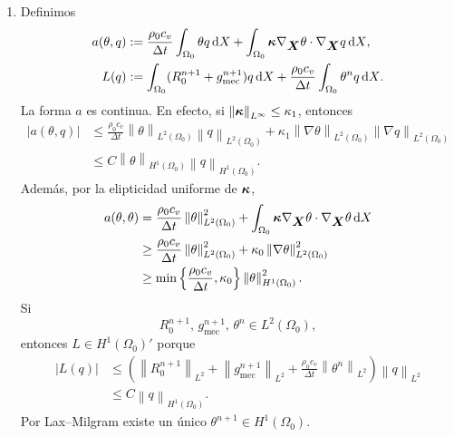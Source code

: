 \documentclass[11pt]{article}
\newcommand{\norm}[1]{\left\lVert #1\right\rVert}
\newcommand{\abs}[1]{\left|#1\right|}
\def\vec   #1{\mbox{\boldmath $#1$}{}}
\def\ten   #1{\mbox{\boldmath $#1$}{}}
\def\dX{\mbox{\(\,\mathrm{d}X\)}}
\begin{document}
\begin{enumerate}[label=\textbf{\arabic*.}, leftmargin=*]
\begin{enumerate}[label=(\alph*)]
        \item Definimos
        \[
        \begin{aligned}
            a(\theta,q)
            &:=
            \frac{\rho_0c_v}{\Delta t}\int_{\Omega_0}\theta q\dX
            +\int_{\Omega_0}\ten\kappa\nabla_{\vec X}\theta\cdot\nabla_{\vec X}q\dX,\\
            L(q)
            &:=
            \int_{\Omega_0}(R_0^{n+1}+g_{\mathrm{mec}}^{n+1})q\dX
            +\frac{\rho_0c_v}{\Delta t}\int_{\Omega_0}\theta^nq\dX.
        \end{aligned}
        \]
        La forma $a$ es continua. En efecto, si $\norm{\ten\kappa}_{L^\infty}\le \kappa_1$, entonces
        \[
        \begin{aligned}
            \abs{a(\theta,q)}
            &\le
            \frac{\rho_0c_v}{\Delta t}
            \norm{\theta}_{L^2(\Omega_0)}
            \norm{q}_{L^2(\Omega_0)}
            +\kappa_1
            \norm{\nabla\theta}_{L^2(\Omega_0)}
            \norm{\nabla q}_{L^2(\Omega_0)}\\
            &\le
            C\norm{\theta}_{H^1(\Omega_0)}
            \norm{q}_{H^1(\Omega_0)}.
        \end{aligned}
        \]
        Además, por la elipticidad uniforme de $\ten\kappa$,
        \[
        \begin{aligned}
            a(\theta,\theta)
            &=
            \frac{\rho_0c_v}{\Delta t}
            \norm{\theta}_{L^2(\Omega_0)}^2
            +\int_{\Omega_0}\ten\kappa\nabla_{\vec X}\theta
            \cdot\nabla_{\vec X}\theta\dX\\
            &\ge
            \frac{\rho_0c_v}{\Delta t}
            \norm{\theta}_{L^2(\Omega_0)}^2
            +\kappa_0\norm{\nabla\theta}_{L^2(\Omega_0)}^2\\
            &\ge
            \min\left\{\frac{\rho_0c_v}{\Delta t},\kappa_0\right\}
            \norm{\theta}_{H^1(\Omega_0)}^2.
        \end{aligned}
        \]
        Si
        \[
            R_0^{n+1},\,g_{\mathrm{mec}}^{n+1},\,\theta^n\in L^2(\Omega_0),
        \]
        entonces $L\in H^1(\Omega_0)'$ porque
        \[
        \begin{aligned}
            \abs{L(q)}
            &\le
            \left(
            \norm{R_0^{n+1}}_{L^2}
            +\norm{g_{\mathrm{mec}}^{n+1}}_{L^2}
            +\frac{\rho_0c_v}{\Delta t}\norm{\theta^n}_{L^2}
            \right)\norm{q}_{L^2}\\
            &\le
            C\norm{q}_{H^1(\Omega_0)}.
        \end{aligned}
        \]
        Por Lax--Milgram existe un único $\theta^{n+1}\in H^1(\Omega_0)$.
    \end{enumerate}

\end{enumerate}
\end{document}
